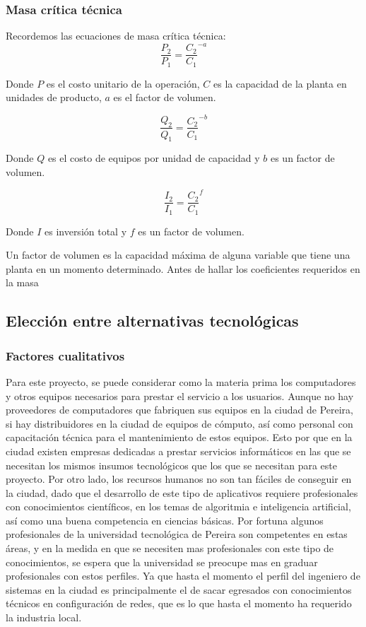 \documentclass[a4paper, 12pt, oneside]{article}
\begin{document}
	\subsubsection{Masa crítica técnica}
	Recordemos las ecuaciones de masa crítica técnica:
	\[\frac{P_2}{P_1} = \frac{C_2}{C_1}^{-a} \]

	Donde $P$ es el costo unitario de la operación, $C$ es la capacidad de la planta en unidades de producto, $a$ es el factor de volumen.

	\[ \frac{Q_2}{Q_1} = \frac{C_2}{C_1}^{-b} \]

	Donde $Q$ es el costo de equipos por unidad de capacidad y $b$ es un factor de volumen.

	\[ \frac{I_2}{I_1} = \frac{C_2}{C_1}^{f} \]

	Donde $I$ es inversión total y $f$ es un factor de volumen. 
	
	Un factor de volumen es la capacidad máxima de alguna variable que tiene una planta en un momento determinado. Antes de hallar los coeficientes requeridos en la masa 

	\subsection{Elección entre alternativas tecnológicas}
	
	\subsubsection{Factores cualitativos}
	Para este proyecto, se puede considerar como la materia prima los computadores y otros equipos necesarios para prestar el servicio a los usuarios. Aunque no hay proveedores de computadores que fabriquen sus equipos en la ciudad de Pereira, si hay distribuidores en la ciudad de equipos de cómputo, así como personal con capacitación técnica para el mantenimiento de estos equipos. Esto por que en la ciudad existen empresas dedicadas a prestar servicios informáticos en las que se necesitan los mismos insumos tecnológicos que los que se necesitan para este proyecto.
	Por otro lado, los recursos humanos no son tan fáciles de conseguir en la ciudad, dado que el desarrollo de este tipo de aplicativos requiere profesionales con conocimientos científicos, en los temas de algoritmia e inteligencia artificial, así como una buena competencia en ciencias básicas. Por fortuna algunos profesionales de la universidad tecnológica de Pereira son competentes en estas áreas, y en la medida en que se necesiten mas profesionales con este tipo de conocimientos, se espera que la universidad se preocupe mas en graduar profesionales con estos perfiles. Ya que hasta el momento el perfil del ingeniero de sistemas en la ciudad es principalmente el de sacar egresados con conocimientos técnicos en configuración de redes, que es lo que hasta el momento ha requerido la industria local.
	
\end{document}
